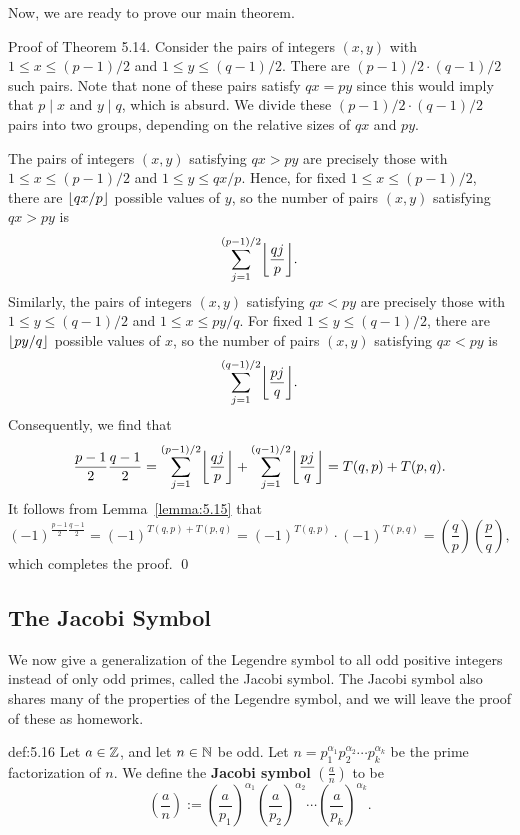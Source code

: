 Now, we are ready to prove our main theorem. 

{\sc Proof of Theorem 5.14.} Consider the pairs of integers $(x, y)$ with 
$1 \leq x \leq (p-1)/2$ and $1 \leq y \leq (q-1)/2$. There are 
$(p-1)/2 \cdot (q-1)/2$ such pairs. Note that none of these pairs satisfy 
$qx = py$ since this would imply that $p \mid x$ and $y \mid q$, which is absurd. 
We divide these $(p-1)/2 \cdot (q-1)/2$ pairs into two groups, depending 
on the relative sizes of $qx$ and $py$. 

The pairs of integers $(x, y)$ satisfying $qx > py$ are precisely those 
with $1 \leq x \leq (p-1)/2$ and $1 \leq y \leq qx/p$. Hence, for fixed 
$1 \leq x \leq (p-1)/2$, there are $\lfloor qx/p\rfloor$ possible values of $y$, so 
the number of pairs $(x, y)$ satisfying $qx > py$ is 
\[ \sum_{j=1}^{(p-1)/2} \floor*{\frac{qj}{p}}. \] 
Similarly, the pairs of integers $(x, y)$ satisfying $qx < py$ are precisely 
those with $1 \leq y \leq (q-1)/2$ and $1 \leq x \leq py/q$. For fixed 
$1 \leq y \leq (q-1)/2$, there are $\lfloor py/q\rfloor$ possible values of $x$, 
so the number of pairs $(x, y)$ satisfying $qx < py$ is 
\[ \sum_{j=1}^{(q-1)/2} \floor*{\frac{pj}{q}}. \] 
Consequently, we find that 
\[ \frac{p-1}2 \frac{q-1}2 = \sum_{j=1}^{(p-1)/2} \floor*{\frac{qj}{p}} 
+ \sum_{j=1}^{(q-1)/2} \floor*{\frac{pj}{q}} = T(q, p) + T(p, q). \] 
It follows from Lemma~\ref{lemma:5.15} that 
\[ (-1)^{\frac{p-1}2 \frac{q-1}2} = (-1)^{T(q, p) + T(p, q)} = 
(-1)^{T(q, p)} \cdot (-1)^{T(p, q)} = \left( \frac qp \right) \left( \frac pq 
\right), \] 
which completes the proof. \qed 

\subsection{The Jacobi Symbol}\label{subsec:5.5}
We now give a generalization of the Legendre symbol to all odd positive integers 
instead of only odd primes, called the Jacobi symbol. The Jacobi symbol also 
shares many of the properties of the Legendre symbol, and we will leave the 
proof of these as homework. 

\begin{defn}{def:5.16}
    Let $a \in \mathbb{Z}$, and let $n \in \mathbb{N}$ be odd. Let $n = p_1^{\alpha_1} 
    p_2^{\alpha_2} \cdots p_k^{\alpha_k}$ be the prime factorization of $n$. 
    We define the {\bf Jacobi symbol} $(\frac{a}{n})$ to be 
    \[ \left( \frac{a}{n} \right) := \left( \frac{a}{p_1} \right)^{\!\alpha_1} 
    \left( \frac{a}{p_2} \right)^{\!\alpha_2} \cdots 
    \left( \frac{a}{p_k} \right)^{\!\alpha_k}. \] 
\end{defn}

